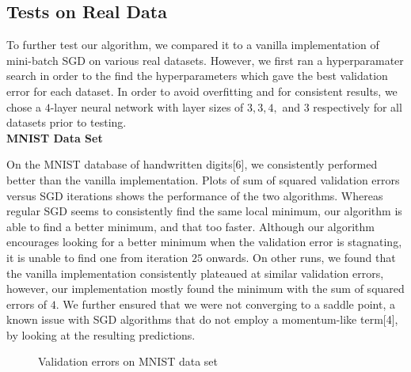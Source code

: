 \documentclass{article}
\begin{document}
\subsection{Tests on Real Data}
To further test our algorithm, we compared it to a vanilla implementation of mini-batch SGD on various real datasets. However, we first ran a hyperparamater search in order to the find the hyperparameters which gave the best validation error for each dataset. In order to avoid overfitting and for consistent results, we chose a $ 4 $-layer neural network with layer sizes of $ 3, 3, 4, $ and $ 3 $ respectively for all datasets prior to testing.
\\

\textbf{MNIST Data Set}
\par On the MNIST database of handwritten digits[6], 
we consistently performed better than the vanilla implementation. Plots of sum of squared validation errors versus SGD iterations shows the performance of the two algorithms. Whereas regular SGD seems to consistently find the same local minimum, our algorithm is able to find a better minimum, and that too faster. Although our algorithm encourages looking for a better minimum when the validation error is stagnating, it is unable to find one from iteration $ 25 $ onwards. On other runs, we found that the vanilla implementation consistently plateaued at similar validation errors, however, our implementation mostly found the minimum with the sum of squared errors of $ 4 $. We further ensured that we were not converging to a saddle point, a known issue with SGD algorithms that do not employ a momentum-like term[4], by looking at the resulting predictions.
\begin{figure}[H]
	\centering
	\quad
	\caption{Validation errors on MNIST data set}%
	\label{MNIST}%
\end{figure}
\end{document}

